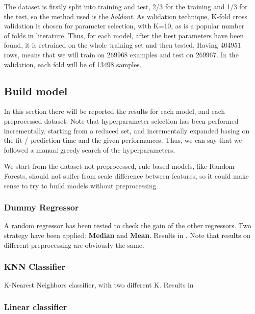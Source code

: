 The dataset is firstly split into training and test, 2/3 for the training and 1/3 for the test, so the method used is the \textit{holdout}. 
As validation technique, K-fold cross validation is chosen for parameter selection, with K=10, as is a popular number of folds in literature.
Thus, for each model, after the best parameters have been found, it is retrained on the whole training set and then tested.
Having 404951 rows, means that we will train on 269968 examples and test on 269967. In the validation, each fold will be of 13498 samples.

\subsection{Build model}

In this section there will be reported the results for each model, and each preprocessed dataset.
Note that hyperparameter selection has been performed incrementally, starting from a reduced set, and incrementally expanded basing on the fit / prediction time and the given performances. 
Thus, we can say that we followed a manual greedy search of the hyperparameters.

\note{}
We start from the dataset not preprocessed, rule based models, like Random Forests, should not suffer from scale difference between features, so it could make sense to try to build models without preprocessing.

\subsubsection{Dummy Regressor}

A random regressor has been tested to check the gain of the other regressors. Two strategy have been applied: \textbf{Median} and \textbf{Mean}. Results in .
Note that results on different preprocessing are obviously the same.



\subsubsection{KNN Classifier}

K-Nearest Neighbors classifier, with two different K. Results in 



\subsubsection{Linear classifier}

